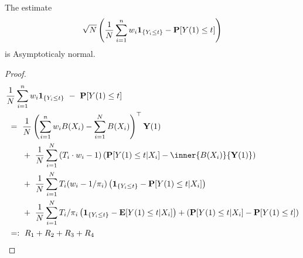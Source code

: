 \begin{theorem}
  The estimate 
  \begin{gather}
    \sqrt{N}
    \left( 
  \frac{1}{N}
    \sum_{i=1}^{n} 
    w_i
    \mathbf{1}
    _{\left\{ Y_i\le t \right\}}
    -
    \P[Y(1)\le t]
    \right)
  \end{gather}
  is Asymptoticaly normal.
\end{theorem}
\begin{proof}
\begin{align*}
  &
    \frac{1}{N}
    \sum_{i=1}^{n} 
    w_i
    \mathbf{1}_{\left\{ Y_i \le t \right\}}
    \ 
    -
    \ 
    \P[Y(1)\le t]
    \\
  &
  \ 
  =
  \ 
  \frac{1}{N}
  \left( 
    \sum_{i=1}^{n} 
    w_i
    B(X_i)
    -
    \sum_{i=1}^{N} 
    B(X_i)
  \right)
  ^\top
     \mathbf{Y}(1) 
  \\
  &
  \qquad
  +
  \ 
  \frac{1}{N}
    \sum_{i=1}^{N} 
    \left( T_i\cdot w_i -1 \right)
    \left( 
    \P[Y(1)\le t| X_i]
    -
    \inner
    {B(X_i)}
    { \mathbf{Y}(1) }
    \right)
  \\
  &
  \qquad
  +
  \ 
  \frac{1}{N}
    \sum_{i=1}^{N} 
    T_i
    (
    w_i 
    -
    1/\pi_i
    )
    \left( 
    \mathbf{1}_{\left\{ Y_i \le t \right\}}
    -
    \P[Y(1)\le t| X_i]
    \right)
  \\
  &
  \qquad
  +
  \ 
  \frac{1}{N}
    \sum_{i=1}^{N} 
    T_i
    /\pi_i
    \left( 
    \mathbf{1}_{\left\{ Y_i \le t \right\}}
    -
    \E[Y(1)\le t| X_i]
    \right)
    +
    \left( 
    \P[Y(1)\le t| X_i]
    -
    \P[Y(1)\le t]
    \right)
  \\
  &
  \ 
  =:
  \ 
  R_1
  +
  R_2
  +
  R_3
  +
  R_4
  \end{align*}


\end{proof}
